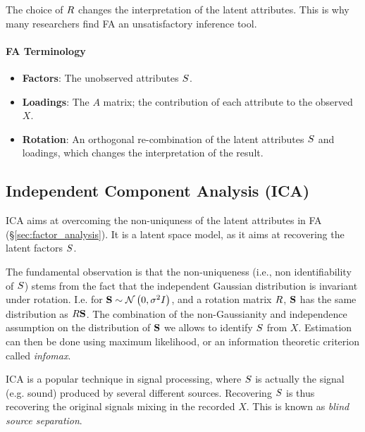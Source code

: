 The choice of $R$ changes the interpretation of the latent attributes. This is why many researchers find FA an unsatisfactory inference tool.


\paragraph{FA Terminology}
\begin{itemize}
\item \textbf{Factors}: The unobserved attributes $S$.
\item \textbf{Loadings}: The $A$ matrix; the contribution of each attribute to the observed $X$.
\item \textbf{Rotation}: An orthogonal re-combination of the latent attributes $S$ and loadings, which changes the interpretation of the result.
\end{itemize}




\subsection{Independent Component Analysis (ICA)}
\label{sec:ica}

ICA aims at overcoming the non-uniquness of the latent attributes in FA (\S\ref{sec:factor_analysis}).
It is a latent space model, as it aims at recovering the latent factors $S$.

The fundamental observation is that the non-uniqueness (i.e., non identifiability of $S$) stems from the fact that the independent Gaussian distribution is invariant under rotation. 
I.e. for $\mathbf{S} \sim \mathcal{N}\left(0,\sigma^2 I\right)$, and a rotation matrix $R$, $\mathbf{S}$ has the same distribution as $R \mathbf{S}$. 
The combination of the non-Gaussianity and independence assumption on the distribution of $\mathbf{S}$ we allows to identify $S$ from $X$.
Estimation can then be done using maximum likelihood, or an information theoretic criterion called \emph{infomax}.


\begin{remark}
ICA is a popular technique in signal processing, where $S$ is actually the signal (e.g. sound) produced by several different sources. 
Recovering $S$ is thus recovering the original signals mixing in the recorded $X$. This is known as \emph{blind source separation}.
\end{remark}


